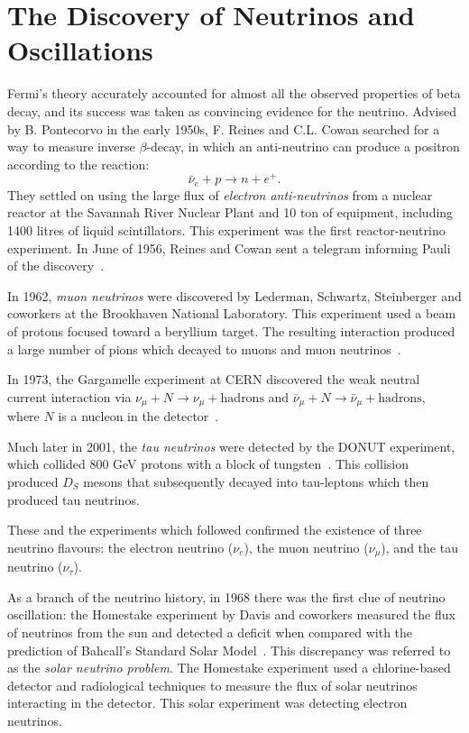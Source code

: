 \section{The Discovery of Neutrinos and Oscillations}
\label{sec:neutrino_history}

Fermi's theory accurately accounted for almost all the observed properties of beta decay, and its success was taken as convincing evidence for the neutrino.
Advised by B. Pontecorvo in the early 1950s, F. Reines and C.L. Cowan searched for a way to measure inverse $\beta$-decay, in which an anti-neutrino can produce a positron according to the reaction:
\[
\bar{\nu}_e + p \rightarrow n + e^+.
\]
They settled on using the large flux of \emph{electron anti-neutrinos} from a nuclear reactor at the Savannah River Nuclear Plant and 10 ton of equipment, including 1400 litres of liquid scintillators. This experiment was the first reactor-neutrino experiment. In June of 1956, Reines and Cowan sent a telegram informing Pauli of the discovery~\cite{reines}.

In 1962, \emph{muon neutrinos} were discovered by Lederman, Schwartz, Steinberger and coworkers at the Brookhaven National Laboratory. This experiment used a beam of protons focused toward a beryllium target. The resulting interaction produced a large number of pions which decayed to muons and muon neutrinos~\cite{lederman}.

In 1973, the Gargamelle experiment at CERN discovered the weak neutral current interaction via $\nu_\mu + N \rightarrow \nu_\mu + \text{hadrons}$ and $\bar{\nu}_\mu + N \rightarrow \bar{\nu}_\mu + \text{hadrons}$, where $N$ is a nucleon in the detector~\cite{gargamelle}. 

Much later in 2001, the \emph{tau neutrinos} were detected by the DONUT experiment, which collided 800 GeV protons with a block of tungsten~\cite{donut}. This collision produced $D_S$ mesons that subsequently decayed into tau-leptons which then produced tau neutrinos. 

These and the experiments which followed confirmed the existence of three neutrino flavours: the electron neutrino ($\nu_e$), the muon neutrino ($\nu_\mu$), and the tau neutrino ($\nu_\tau$).

As a branch of the neutrino history, in 1968 there was the first clue of neutrino oscillation: the Homestake experiment by Davis and coworkers measured the flux of neutrinos from the sun and detected a deficit when compared with the prediction of Bahcall's Standard Solar Model~\cite{giunti}. This discrepancy was referred to as the \emph{solar neutrino problem}. The Homestake experiment used a chlorine-based detector and radiological techniques to measure the flux of solar neutrinos interacting in the detector. This solar experiment was detecting electron neutrinos. 

